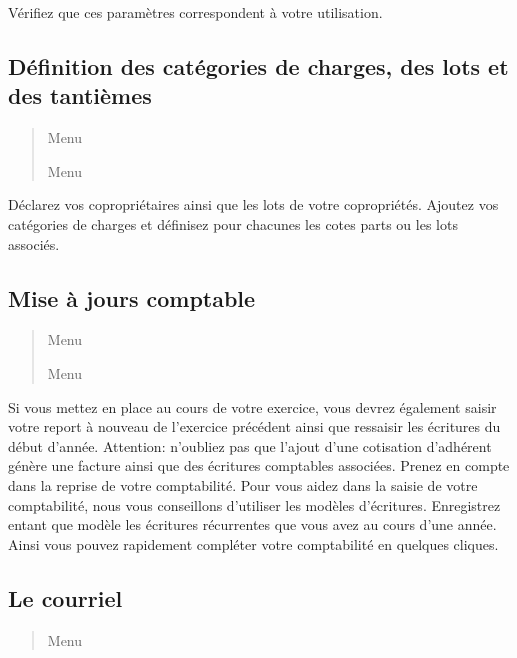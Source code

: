 \documentclass[a4paper,10pt,oneside,french]{sphinxmanual}
\begin{document}
Vérifiez que ces paramètres correspondent à votre utilisation.


\subsection{Définition des catégories de charges, des lots et des tantièmes}
\label{\detokenize{syndic/first_step:definition-des-categories-de-charges-des-lots-et-des-tantiemes}}\begin{quote}

Menu 

Menu 
\end{quote}

Déclarez vos copropriétaires ainsi que les lots de votre copropriétés.
Ajoutez vos catégories de charges et définisez pour chacunes les cotes parts ou les lots associés.


\subsection{Mise à jours comptable}
\label{\detokenize{syndic/first_step:mise-a-jours-comptable}}\begin{quote}

Menu 

Menu 
\end{quote}

Si vous mettez en place  au cours de votre exercice, vous devrez également saisir votre report à nouveau de l’exercice précédent ainsi que ressaisir les écritures du début d’année.
Attention: n’oubliez pas que l’ajout d’une cotisation d’adhérent génère une facture ainsi que des écritures comptables associées. Prenez en compte dans la reprise de votre comptabilité.
Pour vous aidez dans la saisie de votre comptabilité, nous vous conseillons d’utiliser les modèles d’écritures. Enregistrez entant que modèle les écritures récurrentes que vous avez au cours d’une année. Ainsi vous pouvez rapidement compléter votre comptabilité en quelques cliques.


\subsection{Le courriel}
\label{\detokenize{syndic/first_step:le-courriel}}\begin{quote}

Menu 
\end{quote}
\end{document}

